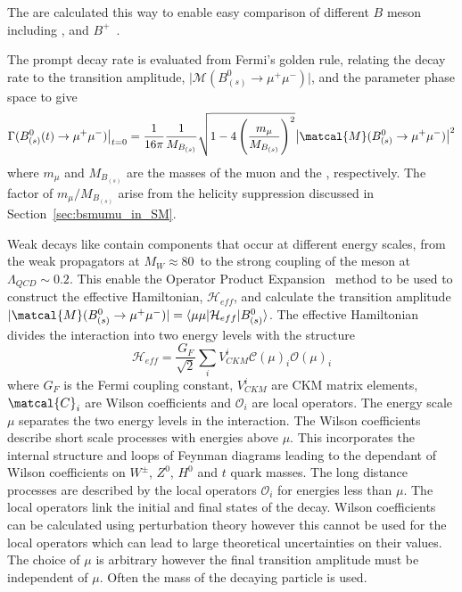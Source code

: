 {{The \BFs are calculated this way to enable easy comparison of different $B$ meson \BFs including \bd, \bs and $B^+$~\cite{}.

The prompt decay rate is evaluated from Fermi's golden rule, relating the decay rate  to the transition amplitude, $\big|\mathcal{M}(B^0_{(s)} \to \mu^+ \mu^-)\big|$, and the parameter phase space to give~\cite{}
\begin{equation}
\Gamma(B^0_{(s)}(t) \to \mu^+ \mu^-)\big{|}_{t=0} = \frac{1}{16\pi} \frac{1}{M_{B_{(s)}}} \sqrt{1 -4 \left (\frac{m_{\mu}}{M_{B_{(s)}}} \right )^2} \big|\matcal{M}(B^0_{(s)} \to \mu^+ \mu^-)\big|^2
\label{sec:FGR}
\end{equation}
where $m_{\mu}$ and $M_{B_{(s)}}$ are the masses of the muon and the \bsd, respectively. The factor of $m_{\mu}/M_{B_{(s)}}$ arise from the helicity suppression discussed in Section~\ref{sec:bsmumu_in_SM}.


Weak decays like \bmumu contain components that occur at different energy scales, from the weak propagators at $M_W \approx 80$~\gevcc to the strong coupling of the \bsd meson at $\Lambda_{QCD} \sim 0.2$\gev. This enable the Operator Product Expansion~\cite{} method to be used to construct the effective Hamiltonian, $\mathcal{H}_{eff}$, and calculate the transition amplitude $|\matcal{M}(B^0_{(s)} \to \mu^+ \mu^-)| = \langle \mu \mu | \mathcal{H}_{eff} | B^0_{(s)} \rangle$. The effective Hamiltonian divides the interaction into two energy levels with the structure
\begin{equation}
\mathcal{H}_{eff}  = \frac{G_F}{\sqrt{2}} \displaystyle\sum_{i} V^i_{CKM} \mathcal{C}(\mu)_i \mathcal{O}(\mu)_i
\label{sec:eff_hamil_def}
\end{equation}
where $G_F$ is the Fermi coupling constant, $V_{CKM}^i$ are CKM matrix elements, $\matcal{C}_i$ are Wilson coefficients and $\mathcal{O}_i$ are local operators. The energy scale $\mu$ separates the two energy levels in the interaction. The Wilson coefficients describe short scale processes with energies above $\mu$. This incorporates the internal structure and loops of Feynman diagrams leading to the dependant of Wilson coefficients on $W^{\pm}$, $Z^0$, $H^0$ and $t$ quark masses. The long distance processes are described by the local operators $\mathcal{O}_i$ for energies less than $\mu$. The local operators link the initial and final states of the decay.%
Wilson coefficients can be calculated using perturbation theory however this cannot be used for the local operators which can lead to large theoretical uncertainties on their values. The choice of $\mu$ is arbitrary however the final transition amplitude must be independent of $\mu$. Often the mass of the decaying particle is used. 

}}
